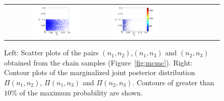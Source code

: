 \begin{figure}[ht]
\begin{tabular}{clc}
\includegraphics[width=0.475\textwidth]{./figures/sample23.pdf} &
\includegraphics[width=0.475\textwidth]{./figures/jpdf23.pdf}
        \end{tabular}
\caption{Left: Scatter plots of the pairs $(n_1,n_2)$,$(n_1,n_3)$ and $(n_2,n_3)$ obtained from the
chain samples (Figure~\ref{fig:mcmc}). 
Right: Contour plots of the marginalized joint posterior distribution $\Pi(n_1,n_2)$, $\Pi(n_1,n_3)$ and $\Pi(n_2,n_3)$.  Contours of greater than $10\%$ of the maximum probability are shown.}
\label{fig:joint} 
        \end{figure}

